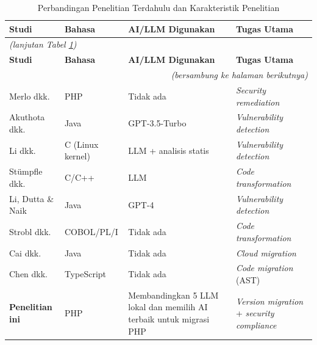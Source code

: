     \begin{longtable}{|l|p{3cm}|p{3cm}|p{3cm}|}
    \caption{Perbandingan Penelitian Terdahulu dan Karakteristik Penelitian}
    \label{tab:perbandingan-1} \\
    \hline
    \textbf{Studi} & \textbf{Bahasa} & \textbf{AI/LLM Digunakan} & \textbf{Tugas Utama} \\
    \hline \hline
    \endfirsthead
    \multicolumn{4}{l}{\textit{(lanjutan Tabel \ref{tab:perbandingan-1})}} \\
    \hline
    \textbf{Studi} & \textbf{Bahasa} & \textbf{AI/LLM Digunakan} & \textbf{Tugas Utama} \\
    \hline \hline
    \endhead
    \hline
    \multicolumn{4}{r}{\textit{(bersambung ke halaman berikutnya)}} \\
    \endfoot
    \hline
    \endlastfoot
    Merlo dkk. \cite{merlo2007automated} & PHP & Tidak ada & \textit{Security remediation} \\
    \hline
    Akuthota dkk. \cite{akuthota2023vulnerability} & Java & GPT-3.5-Turbo & \textit{Vulnerability detection} \\
    \hline
    Li dkk. \cite{li2025software} & C (Linux kernel) & LLM + analisis statis & \textit{Vulnerability detection} \\
    \hline
    St\"{u}mpfle dkk. \cite{stumpfle2025llm} & C/C++ & LLM & \textit{Code transformation} \\
    \hline
    Li, Dutta \& Naik \cite{li2025iris} & Java & GPT-4 & \textit{Vulnerability detection} \\
    \hline
    Strobl dkk. \cite{strobl2020automated} & COBOL/PL/I & Tidak ada & \textit{Code transformation} \\
    \hline
    Cai dkk. \cite{cai2015pattern} & Java & Tidak ada & \textit{Cloud migration} \\
    \hline
    Chen dkk. \cite{chen2022ast} & TypeScript & Tidak ada & \textit{Code migration} (AST) \\
    \hline
    \textbf{Penelitian ini} & PHP & Membandingkan 5 LLM lokal dan memilih AI terbaik untuk migrasi PHP & \textit{Version migration} + \textit{security compliance} \\
    \hline
    \end{longtable}

